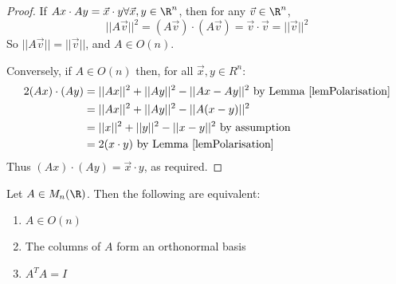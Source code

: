 \documentclass[../Main.tex]{subfiles}
\begin{document}
\begin{proof}
    If $Ax \cdot Ay = \vec{x} \cdot y \forall \vec{x}, y \in \R^n$, then for any $\vec{v} \in \R^n$,
    \begin{equation*}
        ||A\vec{v}||^2 = (A\vec{v}) \cdot (A\vec{v}) = \vec{v} \cdot \vec{v} = ||\vec{v}||^2
    \end{equation*}
    So $||A\vec{v}|| = ||\vec{v}||$, and $A \in O(n)$.\par
    Conversely, if $A \in O(n)$ then, for all $\vec{x}, y \in R^n$:
    \begin{align*}
        2(Ax) \cdot (Ay) &= ||Ax||^2 + ||Ay||^2 - ||Ax - Ay||^2 \text{ by Lemma~\ref{lemPolarisation}} \\
        &= ||Ax||^2 + ||Ay||^2 - ||A(x-y)||^2 \\
        &= ||x||^2 + ||y||^2 - ||x-y||^2 \text{ by assumption} \\
        &= 2(x \cdot y) \text{ by Lemma~\ref{lemPolarisation}}
    \end{align*}
    Thus $(Ax) \cdot (Ay) = \vec{x} \cdot y$, as required.
\end{proof}
\begin{lemma}[Matrices in $O(n)$]
    Let $A \in M_n(\R)$. Then the following are equivalent:
    \begin{enumerate}
        \item $A \in O(n)$ \label{stmtAInOrthGrp}
        \item The columns of $A$ form an orthonormal basis \label{stmtColumnsOrth}
        \item $A^T A = I$ \label{stmtTransposeInverse}
    \end{enumerate}
\end{lemma}
\end{document}
